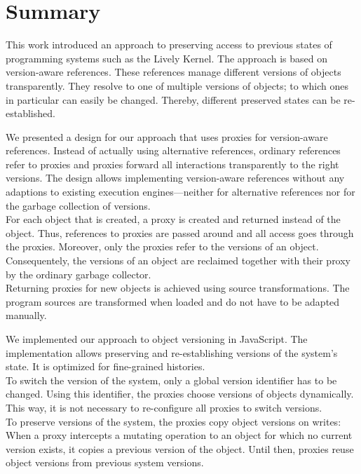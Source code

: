 \chapter{Summary} \label{chapter:SUMMARY}

This work introduced an approach to preserving access to previous states of programming systems such as the Lively Kernel.
The approach is based on version-aware references.
These references manage different versions of objects transparently.
They resolve to one of multiple versions of objects; to which ones in particular can easily be changed.
Thereby, different preserved states can be re-established.

We presented a design for our approach that uses proxies for version-aware references.
Instead of actually using alternative references, ordinary references refer to proxies and proxies forward all interactions transparently to the right versions.
The design allows implementing version-aware references without any adaptions to existing execution engines---neither for alternative references nor for the garbage collection of versions.\\
For each object that is created, a proxy is created and returned instead of the object.
Thus, references to proxies are passed around and all access goes through the proxies.
Moreover, only the proxies refer to the versions of an object.
Consequentely, the versions of an object are reclaimed together with their proxy by the ordinary garbage collector.\\
Returning proxies for new objects is achieved using source transformations.
The program sources are transformed when loaded and do not have to be adapted manually.

We implemented our approach to object versioning in JavaScript.
The implementation allows preserving and re-establishing versions of the system's state.
It is optimized for fine-grained histories.\\
To switch the version of the system, only a global version identifier has to be changed.
Using this identifier, the proxies choose versions of objects dynamically.
This way, it is not necessary to re-configure all proxies to switch versions.\\
To preserve versions of the system, the proxies copy object versions on writes: When a proxy intercepts a mutating operation to an object for which no current version exists, it copies a previous version of the object.
Until then, proxies reuse object versions from previous system versions.

